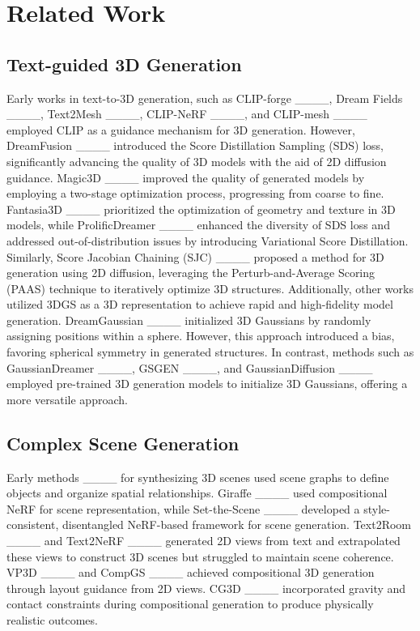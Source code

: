 \section{Related Work}
\subsection{Text-guided 3D Generation}

Early works in text-to-3D generation, such as CLIP-forge ____, Dream Fields ____, Text2Mesh ____, CLIP-NeRF ____, and CLIP-mesh ____ employed CLIP as a guidance mechanism for 3D generation. However, DreamFusion ____ introduced the Score Distillation Sampling (SDS) loss, significantly advancing the quality of 3D models with the aid of 2D diffusion guidance. Magic3D ____ improved the quality of generated models by employing a two-stage optimization process, progressing from coarse to fine. Fantasia3D ____ prioritized the optimization of geometry and texture in 3D models, while ProlificDreamer ____ enhanced the diversity of SDS loss and addressed out-of-distribution issues by introducing Variational Score Distillation. Similarly, Score Jacobian Chaining (SJC) ____ proposed a method for 3D generation using 2D diffusion, leveraging the Perturb-and-Average Scoring (PAAS) technique to iteratively optimize 3D structures. Additionally, other works utilized 3DGS as a 3D representation to achieve rapid and high-fidelity model generation. DreamGaussian ____ initialized 3D Gaussians by randomly assigning positions within a sphere. However, this approach introduced a bias, favoring spherical symmetry in generated structures. In contrast, methods such as GaussianDreamer ____, GSGEN ____, and GaussianDiffusion ____ employed pre-trained 3D generation models to initialize 3D Gaussians, offering a more versatile approach.

\subsection{Complex Scene Generation}
Early methods ____ for synthesizing 3D scenes used scene graphs to define objects and organize spatial relationships. Giraffe ____ used compositional NeRF for scene representation, while Set-the-Scene ____ developed a style-consistent, disentangled NeRF-based framework for scene generation. Text2Room ____ and Text2NeRF ____ generated 2D views from text and extrapolated these views to construct 3D scenes but struggled to maintain scene coherence. VP3D ____ and CompGS ____ achieved compositional 3D generation through layout guidance from 2D views. CG3D ____ incorporated gravity and contact constraints during compositional generation to produce physically realistic outcomes. 

